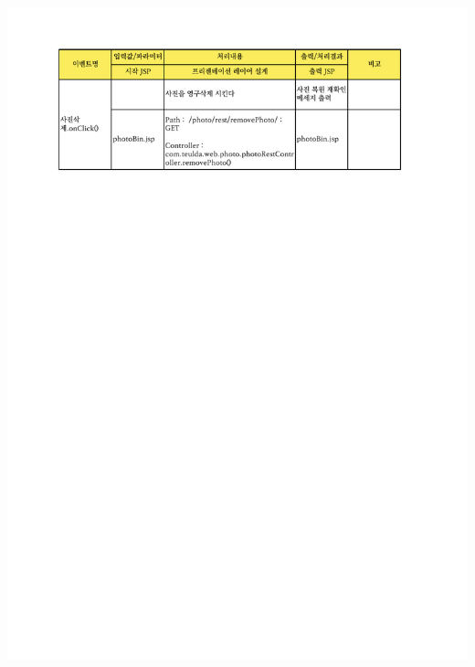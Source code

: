 {{{{{{{{{{{{{{{{{{{{{{{{{{{{{{{{{{{{{{{{{{{{{{{{{{{\includegraphics[width=20cm]{./Figure/Design/Display/photo/photo_07.pdf} \\
}}}}}}}}}}}}}}}}}}}}}}}}}}}}}}}}}}}}}}}}}}}}}}}}}}}
